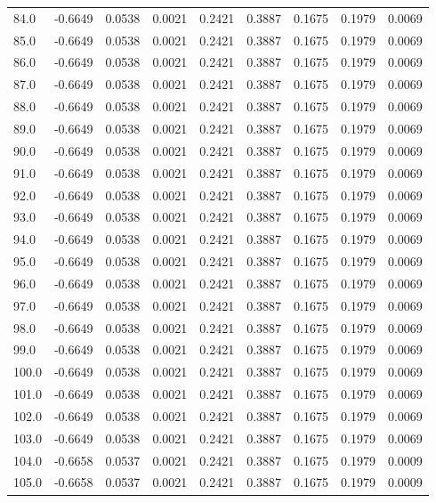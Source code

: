 \begin{longtable}{lrrrrrrrr}
84.0 & -0.6649 & 0.0538 & 0.0021 & 0.2421 & 0.3887 & 0.1675 & 0.1979 & 0.0069 \\
85.0 & -0.6649 & 0.0538 & 0.0021 & 0.2421 & 0.3887 & 0.1675 & 0.1979 & 0.0069 \\
86.0 & -0.6649 & 0.0538 & 0.0021 & 0.2421 & 0.3887 & 0.1675 & 0.1979 & 0.0069 \\
87.0 & -0.6649 & 0.0538 & 0.0021 & 0.2421 & 0.3887 & 0.1675 & 0.1979 & 0.0069 \\
88.0 & -0.6649 & 0.0538 & 0.0021 & 0.2421 & 0.3887 & 0.1675 & 0.1979 & 0.0069 \\
89.0 & -0.6649 & 0.0538 & 0.0021 & 0.2421 & 0.3887 & 0.1675 & 0.1979 & 0.0069 \\
90.0 & -0.6649 & 0.0538 & 0.0021 & 0.2421 & 0.3887 & 0.1675 & 0.1979 & 0.0069 \\
91.0 & -0.6649 & 0.0538 & 0.0021 & 0.2421 & 0.3887 & 0.1675 & 0.1979 & 0.0069 \\
92.0 & -0.6649 & 0.0538 & 0.0021 & 0.2421 & 0.3887 & 0.1675 & 0.1979 & 0.0069 \\
93.0 & -0.6649 & 0.0538 & 0.0021 & 0.2421 & 0.3887 & 0.1675 & 0.1979 & 0.0069 \\
94.0 & -0.6649 & 0.0538 & 0.0021 & 0.2421 & 0.3887 & 0.1675 & 0.1979 & 0.0069 \\
95.0 & -0.6649 & 0.0538 & 0.0021 & 0.2421 & 0.3887 & 0.1675 & 0.1979 & 0.0069 \\
96.0 & -0.6649 & 0.0538 & 0.0021 & 0.2421 & 0.3887 & 0.1675 & 0.1979 & 0.0069 \\
97.0 & -0.6649 & 0.0538 & 0.0021 & 0.2421 & 0.3887 & 0.1675 & 0.1979 & 0.0069 \\
98.0 & -0.6649 & 0.0538 & 0.0021 & 0.2421 & 0.3887 & 0.1675 & 0.1979 & 0.0069 \\
99.0 & -0.6649 & 0.0538 & 0.0021 & 0.2421 & 0.3887 & 0.1675 & 0.1979 & 0.0069 \\
100.0 & -0.6649 & 0.0538 & 0.0021 & 0.2421 & 0.3887 & 0.1675 & 0.1979 & 0.0069 \\
101.0 & -0.6649 & 0.0538 & 0.0021 & 0.2421 & 0.3887 & 0.1675 & 0.1979 & 0.0069 \\
102.0 & -0.6649 & 0.0538 & 0.0021 & 0.2421 & 0.3887 & 0.1675 & 0.1979 & 0.0069 \\
103.0 & -0.6649 & 0.0538 & 0.0021 & 0.2421 & 0.3887 & 0.1675 & 0.1979 & 0.0069 \\
104.0 & -0.6658 & 0.0537 & 0.0021 & 0.2421 & 0.3887 & 0.1675 & 0.1979 & 0.0009 \\
105.0 & -0.6658 & 0.0537 & 0.0021 & 0.2421 & 0.3887 & 0.1675 & 0.1979 & 0.0009 \\

\end{longtable}

